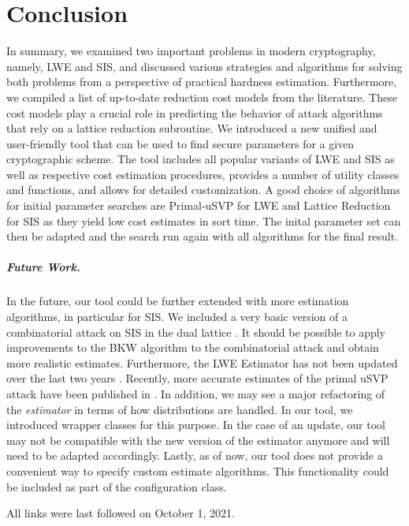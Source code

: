 \documentclass[
  a4paper,  %
  twoside,  %
  bibliography=totoc,
  headsepline,
  cleardoublepage=empty,
  parskip=half,
  draft=false
]{scrbook}
\begin{document}
\chapter{Conclusion}
In summary, we examined two important problems in modern cryptography, namely, LWE and SIS, and discussed various strategies and algorithms for solving both problems from a perspective of practical hardness estimation. Furthermore, we compiled a list of up-to-date reduction cost models from the literature. These cost models play a crucial role in predicting the behavior of attack algorithms that rely on a lattice reduction subroutine. We introduced a new unified and user-friendly tool that can be used to find secure parameters for a given cryptographic scheme. The tool includes all popular variants of LWE and SIS as well as respective cost estimation procedures, provides a number of utility classes and functions, and allows for detailed customization. A good choice of algorithms for initial parameter searches are Primal-uSVP for LWE and Lattice Reduction for SIS as they yield low cost estimates in sort time. The inital parameter set can then be adapted and the search run again with all algorithms for the final result.

\paragraph{Future Work.} In the future, our tool could be further extended with more estimation algorithms, in particular for SIS. We included a very basic version of a combinatorial attack on SIS in the dual lattice \cite{MR09}. It should be possible to apply improvements to the BKW algorithm to the combinatorial attack and obtain more realistic estimates. Furthermore, the LWE Estimator has not been updated over the last two years \cite{APS15}. Recently, more accurate estimates of the primal uSVP attack have been published in \cite{PV21}. In addition, we may see a major refactoring of the \textit{estimator} in terms of how distributions are handled. In our tool, we introduced wrapper classes for this purpose. In the case of an update, our tool may not be compatible with the new version of the estimator anymore and will need to be adapted accordingly.
Lastly, as of now, our tool does not provide a convenient way to specify custom estimate algorithms. This functionality could be included as part of the configuration class.


\printbibliography

All links were last followed on October 1, 2021.

\appendix
{}


\pagestyle{empty}
\renewcommand*{\chapterpagestyle}{empty}
\Versicherung
\end{document}
